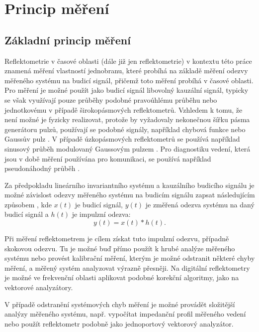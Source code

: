 \chapter{Princip měření}

\section{Základní princip měření}
Reflektometrie v časové oblasti (dále již jen reflektometrie) v kontextu této práce znamená měření vlastností jednobranu, které probíhá na základě měření odezvy měřeného systému na budicí signál, přičemž toto měření probíhá v časové oblasti. Pro měření je možné použít jako budicí signál libovolný kauzální signál, typicky se však využívají pouze průběhy podobné pravoúhlému průběhu nebo jednotkovému v případě širokopásmových reflektometrů. Vzhledem k tomu, že není možné je fyzicky realizovat, protože by vyžadovaly nekonečnou šířku pásma generátoru pulzů, používají se podobné signály, například chybová funkce \cite{S-4manual} nebo Gaussův pulz \cite{ultrawidebandsignals}. V případě úzkopásmových reflektometrů se používá například sinusový průběh modulovaný Gaussovým pulzem \cite{sincgausstdr}. Pro diagnostiku vedení, která jsou v době měření používána pro komunikaci, se používá například pseudonáhodný průběh \cite{noisedomainreflectometry}.

Za předpokladu lineárního invariantního systému a kauzálního budicího signálu je možné závislost odezvy měřeného systému na budicím signálu zapsat následujícím způsobem \cite{principlesoflinearsystems}, kde $x(t)$ je budicí signál, $y(t)$ je změřená odezva systému na daný budicí signál a $h(t)$ je impulzní odezva:
\begin{equation}
y(t)=x(t) \ast h(t).
\end{equation}

Při měření reflektometrem je cílem získat tuto impulzní odezvu, případně skokovou odezvu. Tu je možné buď přímo použít k hrubé analýze měřeného systému nebo provést kalibrační měření, kterým je možné odstranit některé chyby měření, a měřený systém analyzovat výrazně přesněji. Na digitální reflektometry je možné ve frekvenční oblasti aplikovat podobné korekční algoritmy, jako na vektorové analyzátory.

V případě odstranění systémových chyb měření je možné provádět složitější analýzy měřeného systému, např. vypočítat impedanční profil měřeného vedení nebo použít reflektometr podobně jako jednoportový vektorový analyzátor.

